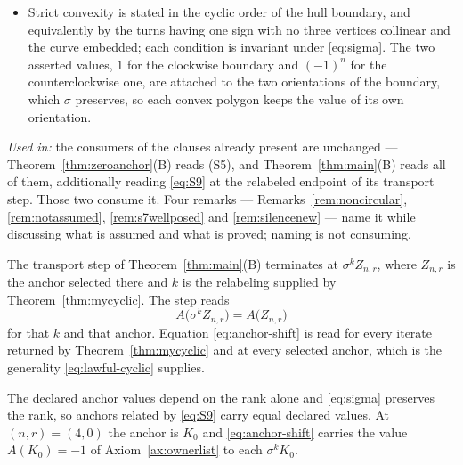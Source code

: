 \begin{axiom}
\begin{itemize}
\begin{equation}
    C(P_+)-C(P_-)=s\,C(\lambda_1)C(\lambda_2)
    \label{eq:lawful-s7}
  \end{equation}
  transports with the same sign, the values $C(\lambda_i)$ agreeing with those
  of the relabeled halves by \eqref{eq:S9} at the halves' arities.
\item[(S8)] Strict convexity is stated in the cyclic order of the hull boundary,
  and equivalently by the turns having one sign with no three vertices collinear
  and the curve embedded; each condition is invariant under \eqref{eq:sigma}.
  The two asserted values, $1$ for the clockwise boundary and $(-1)^{n}$ for the
  counterclockwise one, are attached to the two orientations of the boundary,
  which $\sigma$ preserves, so each convex polygon keeps the value of its own
  orientation.
\end{itemize}

\emph{Used in:} the consumers of the clauses already present are unchanged ---
Theorem~\ref{thm:zeroanchor}(B) reads (S5), and Theorem~\ref{thm:main}(B) reads
all of them, additionally reading \eqref{eq:S9} at the relabeled endpoint of its
transport step. Those two consume it. Four
remarks --- Remarks~\ref{rem:noncircular}, \ref{rem:notassumed},
\ref{rem:s7wellposed} and \ref{rem:silencenew} --- name it while discussing what
is assumed and what is proved; naming is not consuming.
\end{axiom}

\begin{remark}
\label{rem:lawful-cyclic-use}
The transport step of Theorem~\ref{thm:main}(B) terminates at
$\sigma^{k}Z_{n,r}$, where $Z_{n,r}$ is the anchor selected there and $k$ is the
relabeling supplied by Theorem~\ref{thm:mycyclic}. The step reads
\begin{equation}
  A\bigl(\sigma^{k}Z_{n,r}\bigr)=A\bigl(Z_{n,r}\bigr)
  \label{eq:anchor-shift}
\end{equation}
for that $k$ and that anchor. Equation \eqref{eq:anchor-shift} is read for every
iterate returned by Theorem~\ref{thm:mycyclic} and at every selected anchor,
which is the generality \eqref{eq:lawful-cyclic} supplies.

The declared anchor values depend on the rank alone and \eqref{eq:sigma}
preserves the rank, so anchors related by \eqref{eq:S9} carry equal declared
values. At $(n,r)=(4,0)$ the anchor is $K_0$ and \eqref{eq:anchor-shift} carries
the value $A(K_0)=-1$ of Axiom~\ref{ax:ownerlist} to each $\sigma^{k}K_0$.
\end{remark}

